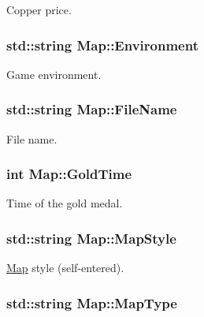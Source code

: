Copper price. 

\hypertarget{structMap_acbaadf8f635b04a1229fa01f6ec4c4dc}{
\subsubsection[{Environment}]{\setlength{\rightskip}{0pt plus 5cm}std\-::string Map\-::\-Environment}}\label{structMap_acbaadf8f635b04a1229fa01f6ec4c4dc}


Game environment. 

\hypertarget{structMap_a0ec301bf4f1d129cd9bc50999581eec9}{
\subsubsection[{File\-Name}]{\setlength{\rightskip}{0pt plus 5cm}std\-::string Map\-::\-File\-Name}}\label{structMap_a0ec301bf4f1d129cd9bc50999581eec9}


File name. 

\hypertarget{structMap_a769a574be92aa024f7804627c167ceff}{
\subsubsection[{Gold\-Time}]{\setlength{\rightskip}{0pt plus 5cm}int Map\-::\-Gold\-Time}}\label{structMap_a769a574be92aa024f7804627c167ceff}


Time of the gold medal. 

\hypertarget{structMap_a5fe4c64985a8d769e21fe32bab7a879c}{
\subsubsection[{Map\-Style}]{\setlength{\rightskip}{0pt plus 5cm}std\-::string Map\-::\-Map\-Style}}\label{structMap_a5fe4c64985a8d769e21fe32bab7a879c}


\hyperlink{structMap}{Map} style (self-\/entered). 

\hypertarget{structMap_a23d051ee3c7cfa606082e700099563b0}{
\subsubsection[{Map\-Type}]{\setlength{\rightskip}{0pt plus 5cm}std\-::string Map\-::\-Map\-Type}}\label{structMap_a23d051ee3c7cfa606082e700099563b0}


